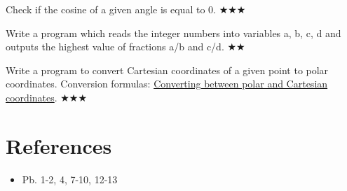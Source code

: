 \documentclass{exam}
\newcommand\lvlez{$\bigstar$}
\newcommand\lvlmed{\lvlez\lvlez}
\newcommand\lvlhard{\lvlmed\lvlez}
\begin{document}
\begin{questions}
   \question Check if the cosine of a given angle is equal to 0. \lvlhard

   \question Write a program which reads the integer numbers into variables a, b, c, d and outputs the highest value of fractions a/b and c/d. \lvlmed

   \question Write a program to convert Cartesian coordinates of a given point to polar coordinates. Conversion formulas: \href{https://en.wikipedia.org/wiki/Polar_coordinate_system#Converting_between_polar_and_Cartesian_coordinates}{Converting between polar and Cartesian coordinates}. \lvlhard

\end{questions}

\medskip
\section*{References}
\begin{itemize}
   \item Pb. 1-2, 4, 7-10, 12-13 \cite{cplab03}
\end{itemize}
\printbibliography[heading=none]
\end{document}
